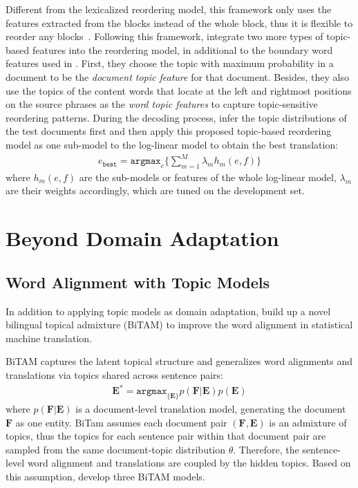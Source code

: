 Different from the lexicalized reordering model, this framework only uses the features extracted from the blocks instead of the whole block, thus it is flexible to reorder any blocks~\citep{Xiong-2006}. Following this framework, \citet{wang-14} integrate two more types of topic-based features into the reordering model, in additional to the boundary word features used in \citet{Xiong-2006}. First, they choose the topic with maximum probability in a document to be the \textit{document topic feature} for that document. Besides, they also use the topics of the content words that locate at the left and rightmost positions on the source phrases as the \textit{word topic features} to capture topic-sensitive reordering patterns. During the decoding process, \citet{Xiong-2006} infer the topic distributions of the test documents first and then apply this proposed topic-based reordering model as one sub-model to the log-linear model to obtain the best translation:
\begin{align}
e_\texttt{best} = \texttt{argmax}_e \Big \{ \sum_{m=1}^M \lambda_m h_m(e,f) \Big \}
\end{align}
where $h_m(e,f)$ are the  sub-models or features of the whole log-linear model, $\lambda_m$ are their weights accordingly, which are tuned on the development set.

\section{Beyond Domain Adaptation}

\subsection{Word Alignment with Topic Models}

In addition to applying topic models as domain adaptation, \citet{zhao-06} build up a novel bilingual topical admixture (BiTAM) to improve the word alignment in statistical machine translation. 

BiTAM captures the latent topical structure and generalizes word alignments and translations via topics shared across sentence pairs:
\begin{align}
\textbf{E}^{*} = \texttt{argmax}_{\{\textbf{E}\}} p(\textbf{F} | \textbf{E})p(\textbf{E})
\end{align}
where $p(\textbf{F} | \textbf{E})$ is a document-level translation model, generating the document $\textbf{F}$ as one entity. BiTam assumes each document pair $(\textbf{F}, \textbf{E})$ is an admixture of topics, thus the topics for each sentence pair within that document pair are sampled from the same document-topic distribution $\theta$. Therefore, the sentence-level word alignment and translations are coupled by the hidden topics.  Based on this assumption, \citet{zhao-06} develop three BiTAM models.

